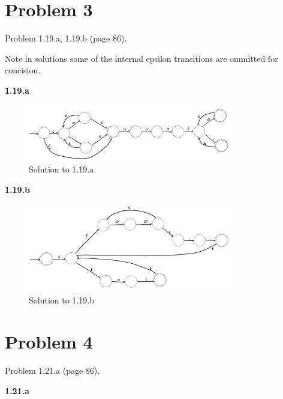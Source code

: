 \documentclass[11pt]{article}
\begin{document}
\newpage
\section*{Problem 3}

Problem 1.19.a, 1.19.b (page 86).
\newline

Note in solutions some of the internal epsilon transitions are ommitted for concision. 

\textbf{1.19.a}

\begin{figure}[H]
     \centering
     \includegraphics[width = 0.8\textwidth]{1_19a_CSCI338.PNG}
     \caption{Solution to 1.19.a}
     \label{fig:1.19.a}
 \end{figure}

\textbf{1.19.b}

\begin{figure}[H]
     \centering
     \includegraphics[width = 0.8\textwidth]{1_19b_CSCI338.PNG}
     \caption{Solution to 1.19.b}
     \label{fig:1.19.b}
 \end{figure}

\newpage
\section*{Problem 4}

Problem 1.21.a (page 86).
\newline

\textbf{1.21.a}
\end{document}
